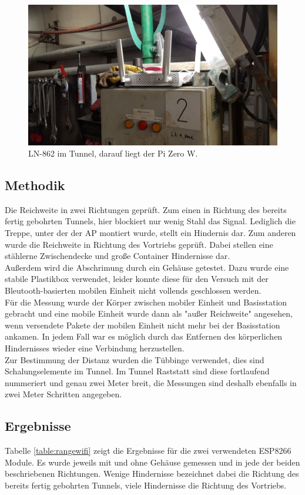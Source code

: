\begin{figure}[h]
  \centering
	\includegraphics[width=\textwidth]{images/applacement.jpg}
  \caption{LN-862 im Tunnel, darauf liegt der Pi Zero W.}
  \label{fig:applacement}
\end{figure}

\subsection{Methodik}
Die Reichweite in zwei Richtungen geprüft.
Zum einen in Richtung des bereits fertig gebohrten Tunnels, hier blockiert nur wenig Stahl das Signal. 
Lediglich die Treppe, unter der der AP montiert wurde, stellt ein Hindernis dar.
Zum anderen wurde die Reichweite in Richtung des Vortriebs geprüft.
Dabei stellen eine stählerne Zwischendecke und große Container Hindernisse dar.\\
Außerdem wird die Abschrimung durch ein Gehäuse getestet.
Dazu wurde eine stabile Plastikbox verwendet, leider konnte diese für den Versuch mit der Bleutooth-basierten mobilen Einheit nicht vollends geschlossen werden.\\
Für die Messung wurde der Körper zwischen mobiler Einheit und Basisstation gebracht und eine mobile Einheit wurde dann als "außer Reichweite" angesehen, wenn versendete Pakete der mobilen Einheit nicht mehr bei der Basisstation ankamen.
In jedem Fall war es möglich durch das Entfernen des körperlichen Hindernisses wieder eine Verbindung herzustellen.\\
Zur Bestimmung der Distanz wurden die Tübbinge verwendet, dies sind Schalungselemente im Tunnel.
Im Tunnel Raststatt sind diese fortlaufend nummeriert und genau zwei Meter breit, die Messungen sind deshalb ebenfalls in zwei Meter Schritten angegeben.

\subsection{Ergebnisse}
Tabelle \ref{table:rangewifi} zeigt die Ergebnisse für die zwei verwendeten ESP8266 Module.
Es wurde jeweils mit und ohne Gehäuse gemessen und in jede der beiden beschriebenen Richtungen.
Wenige Hindernisse bezeichnet dabei die Richtung des bereits fertig gebohrten Tunnels, viele Hindernisse die Richtung des Vortriebs.

